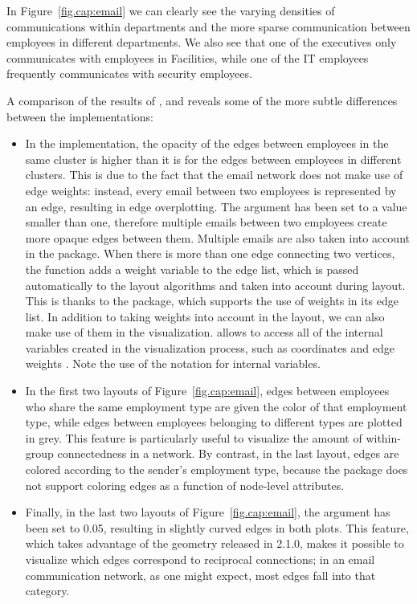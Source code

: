 In Figure~\ref{fig.cap:email} 
we can clearly see the varying densities of communications within departments and the more sparse communication between employees in different departments. We also see that one of the executives only communicates with employees in Facilities, while one of the IT employees frequently communicates with security employees.

A comparison of the results of ,  and  reveals some of the more subtle differences between the implementations:

\begin{itemize}

  \item In the  implementation, the opacity of the edges between employees in the same cluster is higher than it is for the edges between employees in different clusters. This is due to the fact that the email network does not make use of edge weights: instead, every email between two employees is represented by an edge, resulting in edge overplotting. The  argument has been set to a value smaller than one, therefore multiple emails between two employees create more opaque edges between them. Multiple emails are also taken into account in the  package. When there is more than one edge connecting two vertices, the  function adds a weight variable to the edge list, which  is passed automatically to the layout algorithms and taken into account during layout. This is thanks to the  package, which supports the use of weights in its edge list. In addition to taking weights into account in the layout, we can also make use of them in the visualization.  allows to access all of the internal variables created in the visualization process, such as coordinates  and edge weights . Note the use of the  notation  for internal variables.
  \item In the first two layouts of Figure~\ref{fig.cap:email}, edges between employees who share the same employment type are given the color of that employment type, while edges between employees belonging to different types are plotted in grey. This feature is particularly useful to visualize the amount of within-group connectedness in a network. By contrast, in the last layout, edges are colored according to the sender's employment type, because the  package does not support coloring edges as a function of node-level attributes.

	\item Finally, in the last two layouts of Figure~\ref{fig.cap:email}, the  argument has been set to 0.05, resulting in slightly curved edges in both plots. This feature, which takes advantage of the  geometry released in  2.1.0, makes it possible to visualize which edges correspond to reciprocal connections; in an email communication network, as one might expect, most edges fall into that category.
\end{itemize}

